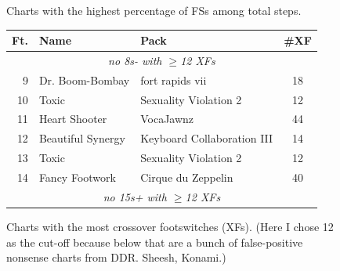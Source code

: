 \documentclass[10pt]{sigplanconf}
\begin{document}
\begin{figure}[t]
\begin{center}
\begin{tabular}{r|l|l|c}
	\end{tabular}
	\end{center}
	\caption{Charts with the highest percentage of FSs among total steps.}
\end{figure}
\begin{figure}[t]
	\begin{center}
		\small
	\begin{tabular}{r|l|l|c}
		\bf Ft. & \bf Name & \bf Pack & \bf \#XF \\
		\hline
		\multicolumn{4}{c}{\em no 8s- with $\ge$12 XFs} \\
		 9 & Dr. Boom-Bombay   & fort rapids vii            & 18 \\
		10 & Toxic             & Sexuality Violation 2      & 12 \\
		11 & Heart Shooter     & VocaJawnz                  & 44 \\
		12 & Beautiful Synergy & Keyboard Collaboration III & 14 \\
		13 & Toxic             & Sexuality Violation 2      & 12 \\
		14 & Fancy Footwork    & Cirque du Zeppelin         & 40 \\
		\multicolumn{4}{c}{\em no 15s+ with $\ge$12 XFs} \\
	\end{tabular}
	\end{center}
	\caption{Charts with the most crossover footswitches (XFs). (Here I chose 12 as the cut-off because below that are a bunch of false-positive nonsense charts from DDR. Sheesh, Konami.)}
\end{figure}
\end{document}
